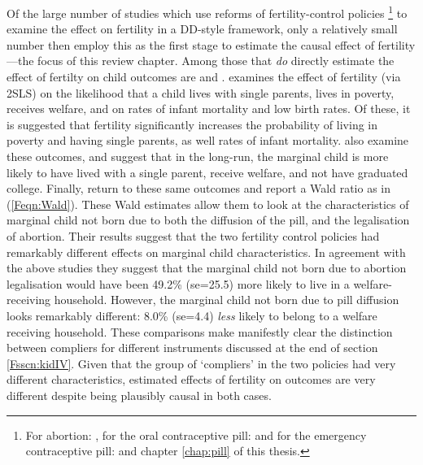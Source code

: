 Of the large number of studies which use reforms of fertility-control policies%
\footnote{For abortion: \citet{Ananatetal2007,Ananatetal2009,AngristEvans1996,
CharlesStephens2006,Cookeetal1999,Currieetal1996,Gruberetal1999,Guldi2008,
KaneStaiger1996,Levineetal1996,Levineetal1996b,Levineetal1999,PopEleches2005,
PopEleches2006}, for the oral contraceptive pill: \citet{OltmansHungerman2012,
Bailey2006,Bailey2011,Bailey2012,Bailey2013,Christensen2012,Goldin2006,
GoldinKatz2002a,GoldinKatz2002b,KearnerLevine2009} and for the emergency 
contraceptive pill: \citet{Durrance2013,Grossetal2014} and chapter 
\ref{chap:pill} of this thesis.} to examine the effect on fertility in a 
DD-style framework, only a relatively small number then employ this 
as the first stage to estimate the causal effect of fertility---the focus of
this review chapter.  Among those that \emph{do} directly estimate the effect
of fertilty on child outcomes are \citet{Gruberetal1999,Ananatetal2009} and
\citet{OltmansHungerman2012}. \citet{Gruberetal1999} examines the effect of 
fertility (via 2SLS) on the likelihood that a child lives with single parents, 
lives in poverty, receives welfare, and on rates of infant mortality and low 
birth rates.  Of these, it is suggested that fertility significantly increases 
the probability of living in poverty and having single parents, as well rates 
of infant mortality. \citet{Ananatetal2009} also examine these outcomes, and 
suggest that in the long-run, the marginal child is more likely to have lived 
with a single parent, receive welfare, and not have graduated college.
Finally, \citet{OltmansHungerman2012} return to these same outcomes and report
a Wald ratio as in (\ref{Feqn:Wald}).  These Wald estimates allow them to look
at the characteristics of marginal child not born due to both the diffusion of 
the pill, and the legalisation of abortion.  Their results suggest that the two 
fertility control policies had remarkably different effects on marginal child 
characteristics.  In agreement with the above studies they suggest that the
marginal child not born due to abortion legalisation would have been 49.2\%
(se=25.5) more likely to live in a welfare-receiving household.  However, the 
marginal child not born due to pill diffusion looks remarkably different: 8.0\% 
(se=4.4) \emph{less} likely to belong to a welfare receiving household.  These 
comparisons make manifestly clear the distinction between compliers for 
different instruments discussed at the end of section \ref{Fsscn:kidIV}.
Given that the group of `compliers' in the two policies had very different
characteristics, estimated effects of fertility on outcomes are very different
despite being plausibly causal in both cases.

